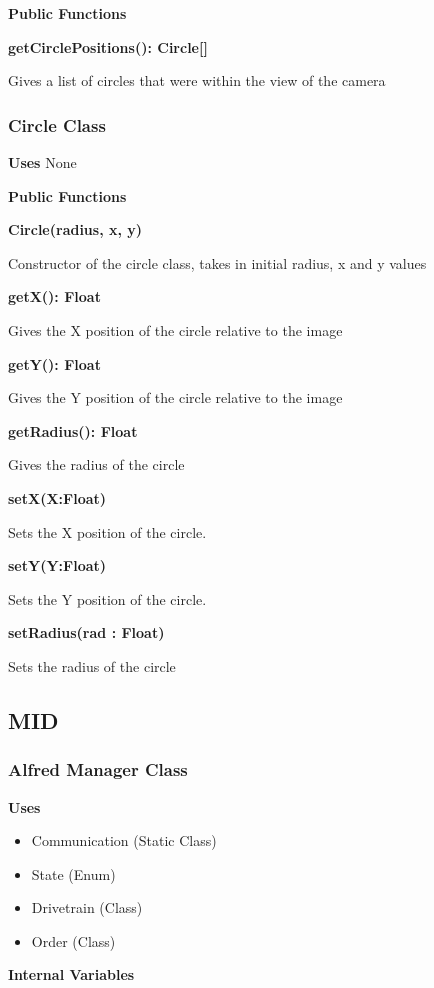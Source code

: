 \documentclass [10pt]{article}
\begin{document}
\textbf{Public Functions}

\textbf{getCirclePositions(): Circle[]}

Gives a list of circles that were within the view of the camera

\subsubsection{Circle Class}

\textbf{Uses}
None

\textbf{Public Functions}

\textbf{Circle(radius, x, y)}

Constructor of the circle class, takes in initial radius, x and y values

\textbf{getX(): Float}

Gives the X position of the circle relative to the image

\textbf{getY(): Float}

Gives the Y position of the circle relative to the image

\textbf{getRadius(): Float}

Gives the radius of the circle

\textbf{setX(X:Float)}

Sets the X position of the circle.

\textbf{setY(Y:Float)}

Sets the Y position of the circle.

\textbf{setRadius(rad : Float)}

Sets the radius of the circle

\subsection{MID}

\subsubsection{Alfred Manager Class}

\textbf{Uses}
\begin{itemize}
	\item Communication (Static Class)
	\item State (Enum)
	\item Drivetrain (Class)
	\item Order (Class)
\end{itemize}


\textbf{Internal Variables}
\end{document}
